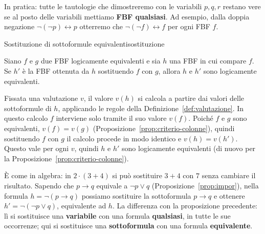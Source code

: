 In pratica: tutte le tautologie che dimostreremo con le variabili $p, q, r$ restano vere se al posto delle
variabili mettiamo \textbf{FBF qualsiasi}. Ad esempio, dalla doppia negazione $\neg(\neg p) \leftrightarrow p$
otterremo che $\neg(\neg f) \leftrightarrow f$ per ogni FBF $f$.

\begin{concetto}
\begin{Proposizione}{Sostituzione di sottoformule equivalenti}{sostituzione}
    \begin{prerequisiti}
    \end{prerequisiti}
    Siano $f$ e $g$ due FBF logicamente equivalenti e sia $h$ una FBF in cui compare $f$.
    Se $h'$ è la FBF ottenuta da $h$ sostituendo $f$ con $g$, allora $h$ e $h'$ sono logicamente equivalenti.
\end{Proposizione}

\begin{dimostrazione}
    Fissata una valutazione $v$, il valore $v(h)$ si calcola a partire dai valori delle sottoformule di $h$,
    applicando le regole della Definizione~\ref{def:valutazione}. In questo calcolo $f$ interviene solo tramite
    il suo valore $v(f)$. Poiché $f$ e $g$ sono equivalenti, $v(f) = v(g)$ (Proposizione~\ref{prop:criterio-colonne}),
    quindi sostituendo $f$ con $g$ il calcolo procede in modo identico e $v(h) = v(h')$.
    Questo vale per ogni $v$, quindi $h$ e $h'$ sono logicamente equivalenti (di nuovo per la Proposizione~\ref{prop:criterio-colonne}).
\end{dimostrazione}
\end{concetto}

\begin{spiegazione}
    È come in algebra: in $2 \cdot (3 + 4)$ si può sostituire $3 + 4$ con $7$ senza cambiare il risultato. Sapendo che $p \rightarrow q$ equivale a $\neg p \vee q$
    (Proposizione~\ref{prop:impor}), nella formula $h = \neg(p \rightarrow q)$ possiamo sostituire la sottoformula $p \rightarrow q$ e ottenere $h' = \neg(\neg p \vee q)$, equivalente
    ad $h$. La differenza con la proposizione precedente: lì si sostituisce una \textbf{variabile} con una formula \textbf{qualsiasi}, in tutte le sue
    occorrenze; qui si sostituisce una \textbf{sottoformula} con una formula \textbf{equivalente}.
\end{spiegazione}


